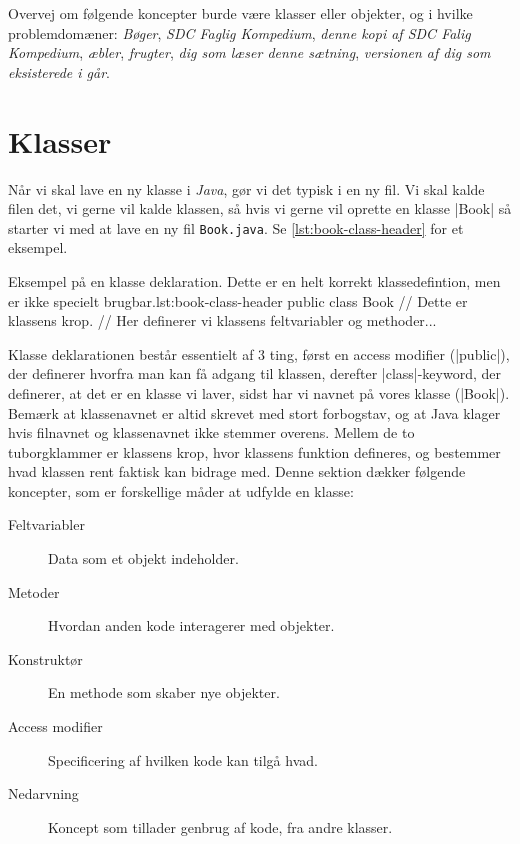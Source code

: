 
\begin{exercise}
    Overvej om følgende koncepter burde være klasser eller objekter,
    og i hvilke problemdomæner: \emph{Bøger}, \emph{SDC Faglig
    Kompedium}, \emph{denne kopi af SDC Falig Kompedium},
    \emph{æbler}, \emph{frugter}, \emph{dig som læser denne sætning},
    \emph{versionen af dig som eksisterede i går}.
\end{exercise}

\section{Klasser}

Når vi skal lave en ny klasse i \emph{Java}, gør vi det typisk i en ny fil.
Vi skal kalde filen det, vi gerne vil kalde klassen, så hvis vi gerne
vil oprette en klasse \JavaInline|Book| så starter vi med at lave en
ny fil \verb|Book.java|. Se \autoref{lst:book-class-header} for et eksempel.

\begin{JavaCode}{Eksempel på en klasse deklaration. Dette er en helt korrekt klassedefintion, men er ikke specielt brugbar.}{lst:book-class-header}
	public class Book {
		// Dette er klassens krop.
        // Her definerer vi klassens feltvariabler og methoder...
	}
\end{JavaCode}

Klasse deklarationen består essentielt af 3 ting, først en access
modifier (\JavaInline|public|), der definerer hvorfra man kan få
adgang til klassen, derefter \JavaInline|class|-keyword, der definerer,
at det er en klasse vi laver, sidst har vi navnet på vores klasse
(\JavaInline|Book|). Bemærk at klassenavnet er altid skrevet med stort
forbogstav, og at Java klager hvis filnavnet og klassenavnet ikke
stemmer overens. Mellem de to tuborgklammer er klassens krop, hvor
klassens funktion defineres, og bestemmer hvad klassen rent faktisk
kan bidrage med. Denne sektion dækker følgende koncepter, som er
forskellige måder at udfylde en klasse:

\begin{description}
\item [Feltvariabler]    Data som et objekt indeholder.
\item [Metoder]          Hvordan anden kode interagerer med objekter.
\item [Konstruktør]      En methode som skaber nye objekter.
\item [Access modifier]  Specificering af hvilken kode kan tilgå hvad.
\item [Nedarvning]       Koncept som tillader genbrug af kode, fra andre klasser.
\end{description}

